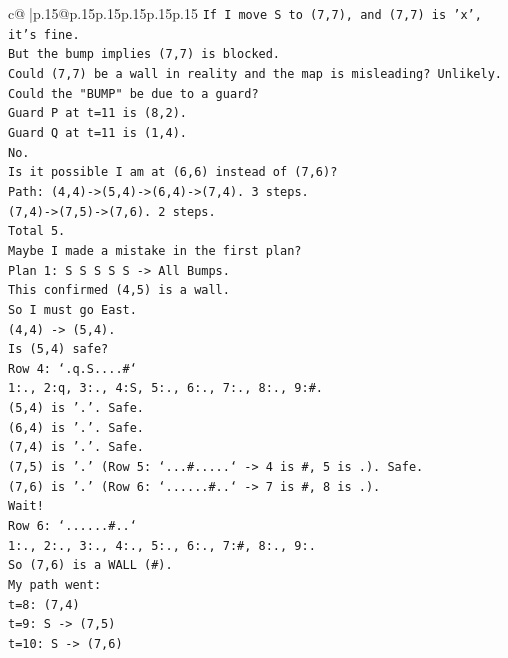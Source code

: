 \documentclass{article}
\begin{document}
{\begin{supertabular}{c@{$\;$}|p{.15\linewidth}@{}p{.15\linewidth}p{.15\linewidth}p{.15\linewidth}p{.15\linewidth}p{.15\linewidth}}
{{{\texttt{If I move S to (7,7), and (7,7) is 'x', it's fine.} \\
\texttt{But the bump implies (7,7) is blocked.} \\
\texttt{Could (7,7) be a wall in reality and the map is misleading? Unlikely.} \\
\texttt{Could the "BUMP" be due to a guard?} \\
\texttt{Guard P at t=11 is (8,2).} \\
\texttt{Guard Q at t=11 is (1,4).} \\
\texttt{No.} \\
\texttt{Is it possible I am at (6,6) instead of (7,6)?} \\
\texttt{Path: (4,4){-}>(5,4){-}>(6,4){-}>(7,4). 3 steps.} \\
\texttt{(7,4){-}>(7,5){-}>(7,6). 2 steps.} \\
\texttt{Total 5.} \\
\texttt{Maybe I made a mistake in the first plan?} \\
\texttt{Plan 1: S S S S S {-}> All Bumps.} \\
\texttt{This confirmed (4,5) is a wall.} \\
\texttt{So I must go East.} \\
\texttt{(4,4) {-}> (5,4).} \\
\texttt{Is (5,4) safe?} \\
\texttt{Row 4: `.q.S....\#`} \\
\texttt{1:., 2:q, 3:., 4:S, 5:., 6:., 7:., 8:., 9:\#.} \\
\texttt{(5,4) is '.'. Safe.} \\
\texttt{(6,4) is '.'. Safe.} \\
\texttt{(7,4) is '.'. Safe.} \\
\texttt{(7,5) is '.' (Row 5: `...\#.....` {-}> 4 is \#, 5 is .). Safe.} \\
\texttt{(7,6) is '.' (Row 6: `......\#..` {-}> 7 is \#, 8 is .).} \\
\texttt{Wait!} \\
\texttt{Row 6: `......\#..`} \\
\texttt{1:., 2:., 3:., 4:., 5:., 6:., 7:\#, 8:., 9:.} \\
\texttt{So (7,6) is a WALL (\#).} \\
\texttt{My path went:} \\
\texttt{t=8: (7,4)} \\
\texttt{t=9: S {-}> (7,5)} \\
\texttt{t=10: S {-}> (7,6)} \\
}}}
\end{supertabular}}
\end{document}
